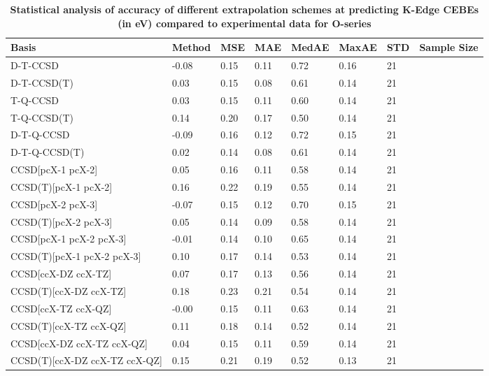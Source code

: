 \begin{table}
  \caption{\textbf{Statistical analysis of accuracy of different extrapolation schemes at predicting K-Edge CEBEs (in eV) compared to experimental data for O-series}}
  \label{tbl:extrap-scheme-summary-o}
  \begin{tabular}{l l l l l l l l }
    \toprule
    \textbf{Basis} & \textbf{Method} & \textbf{MSE} & \textbf{MAE} & \textbf{MedAE} & \textbf{MaxAE} & \textbf{STD} & \textbf{Sample Size} \\ 
    \midrule
    D-T-CCSD & -0.08 & 0.15 & 0.11 & 0.72 & 0.16 & 21 \\ 
    D-T-CCSD(T) & 0.03 & 0.15 & 0.08 & 0.61 & 0.14 & 21 \\ 
    T-Q-CCSD & 0.03 & 0.15 & 0.11 & 0.60 & 0.14 & 21 \\ 
    T-Q-CCSD(T) & 0.14 & 0.20 & 0.17 & 0.50 & 0.14 & 21 \\ 
    D-T-Q-CCSD & -0.09 & 0.16 & 0.12 & 0.72 & 0.15 & 21 \\ 
    D-T-Q-CCSD(T) & 0.02 & 0.14 & 0.08 & 0.61 & 0.14 & 21 \\ 
    CCSD[pcX-1 pcX-2] & 0.05 & 0.16 & 0.11 & 0.58 & 0.14 & 21 \\ 
    CCSD(T)[pcX-1 pcX-2] & 0.16 & 0.22 & 0.19 & 0.55 & 0.14 & 21 \\ 
    CCSD[pcX-2 pcX-3] & -0.07 & 0.15 & 0.12 & 0.70 & 0.15 & 21 \\ 
    CCSD(T)[pcX-2 pcX-3] & 0.05 & 0.14 & 0.09 & 0.58 & 0.14 & 21 \\ 
    CCSD[pcX-1 pcX-2 pcX-3] & -0.01 & 0.14 & 0.10 & 0.65 & 0.14 & 21 \\ 
    CCSD(T)[pcX-1 pcX-2 pcX-3] & 0.10 & 0.17 & 0.14 & 0.53 & 0.14 & 21 \\ 
    CCSD[ccX-DZ ccX-TZ] & 0.07 & 0.17 & 0.13 & 0.56 & 0.14 & 21 \\ 
    CCSD(T)[ccX-DZ ccX-TZ] & 0.18 & 0.23 & 0.21 & 0.54 & 0.14 & 21 \\ 
    CCSD[ccX-TZ ccX-QZ] & -0.00 & 0.15 & 0.11 & 0.63 & 0.14 & 21 \\ 
    CCSD(T)[ccX-TZ ccX-QZ] & 0.11 & 0.18 & 0.14 & 0.52 & 0.14 & 21 \\ 
    CCSD[ccX-DZ ccX-TZ ccX-QZ] & 0.04 & 0.15 & 0.11 & 0.59 & 0.14 & 21 \\ 
    CCSD(T)[ccX-DZ ccX-TZ ccX-QZ] & 0.15 & 0.21 & 0.19 & 0.52 & 0.13 & 21 \\ 
    \bottomrule
  \end{tabular}
\end{table}

